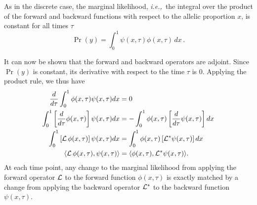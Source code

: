 \documentclass[preprint]{elsarticle}
\newcommand\ie{{\it i.e.,}}
\begin{document}
As in the discrete case, the marginal likelihood, \ie\ the integral over the product of the forward and backward functions with respect to the allelic proportion $x$, is constant for all times $\tau$
\begin{equation}\label{eq:marg_like}
\Pr(y) = \int_{0}^{1} \psi(x,\tau) \phi(x,\tau) \,dx\,.
\end{equation}

It can now be shown that the forward and backward operators are adjoint. Since $\Pr(y)$ is constant, its derivative with respect to the time $\tau$ is $0$. Applying the product rule, we thus have
\begin{equation}\label{eq:adjoint_continuous}
\begin{split}
\frac{d}{d\tau}\int_{0}^{1} \phi(x,\tau) \psi(x,\tau)dx &= 0\\
\int_{0}^{1} \left[\frac{d}{d\tau} \phi(x,\tau)\right] \psi(x,\tau)dx &= -\int_{0}^{1} \phi(x,\tau) \left[\frac{d}{d\tau} \psi(x,\tau)\right] dx\\
\int_{0}^{1} \left[{\cal L}\,\phi(x,\tau)\right] \psi(x,\tau)dx &= \int_{0}^{1}  \phi(x,\tau) \left[{\cal L}^{*} \psi(x,\tau)\right] dx\\
\langle{\cal L}\,\phi(x,\tau), \psi(x,\tau)\rangle &= \langle \phi(x,\tau),{\cal L}^{*} \psi(x,\tau)\rangle.
\end{split}
\end{equation}
At each time point, any change to the marginal likelihood from applying the forward operator ${\cal L}$ to the forward function $\phi(x,\tau)$ is exactly matched by a change from applying the backward operator ${\cal L}^{*}$ to the backward function $\psi(x,\tau)$. 
\end{document}
